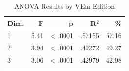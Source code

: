 \begin{table}[H]
  \centering
  \caption{ANOVA Results by VEm Edition}
  \label{tab:anova_edition}
  \begin{tabular}{l r r r r}
    Dim. & F & p & R$^2$ & \% \\
    \hline
    1 & 5.41 & < .0001 & .57155 & 57.16 \\
    2 & 3.94 & < .0001 & .49272 & 49.27 \\
    3 & 3.06 & < .0001 & .42979 & 42.98 \\
  \end{tabular}
\end{table}
